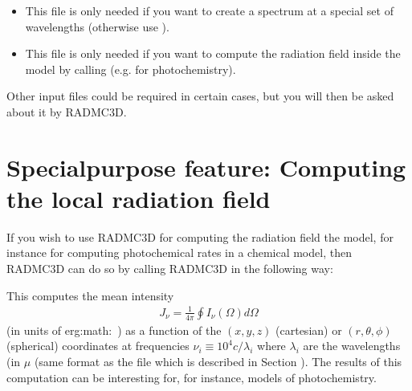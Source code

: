 \documentclass[letterpaper,10pt,english]{sphinxmanual}
\begin{document}
\begin{itemize}
\item {} 
 This file is only needed if you
want to create a spectrum at a special set of wavelengths (otherwise use
).

\item {} 
 This file is only needed if you
want to compute the radiation field inside the model by calling  (e.g. for photochemistry).

\end{itemize}

Other input files could be required in certain cases, but you will then
be asked about it by RADMC\sphinxhyphen{}3D.


\section{Special\sphinxhyphen{}purpose feature: Computing the local radiation field}
\label{\detokenize{dustradtrans:special-purpose-feature-computing-the-local-radiation-field}}\label{\detokenize{dustradtrans:sec-dust-monochromatic-monte-carlo}}
If you wish to use RADMC\sphinxhyphen{}3D for computing the radiation field 
the model, for instance for computing photochemical rates in a chemical model,
then RADMC\sphinxhyphen{}3D can do so by calling RADMC\sphinxhyphen{}3D in the following way:

\begin{sphinxVerbatim}[commandchars=\\\{\}]
 
\end{sphinxVerbatim}

This computes the mean intensity
\begin{equation*}
\begin{split}J_\nu = \frac{1}{4\pi}\oint I_\nu(\Omega)d\Omega\end{split}
\end{equation*}
(in units of
erg:math:\(\,\)\(\,\)\(\,\))
as a function of the \((x,y,z)\) (cartesian) or \((r,\theta,\phi)\)
(spherical) coordinates at frequencies \(\nu_i\equiv 10^4c/\lambda_i\) where
\(\lambda_i\) are the wavelengths (in \(\mu\) (same format as the file
 which is described in Section
{\hyperref[\detokenize{inputoutputfiles:sec-wavelengths}]{}}). The results of this computation can be interesting for,
for instance, models of photochemistry.
\end{document}
